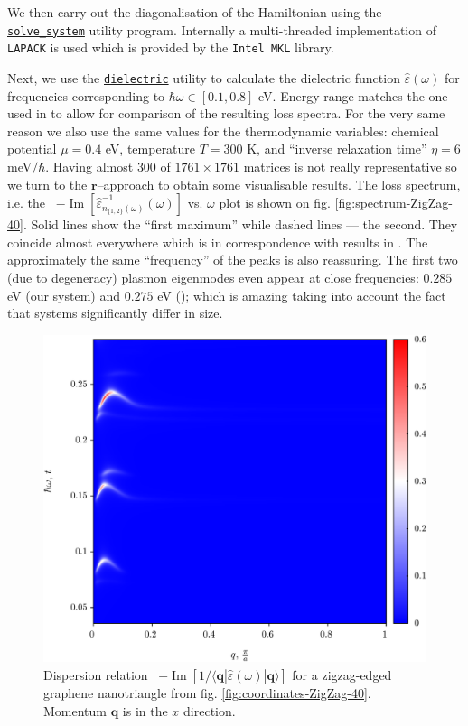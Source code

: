 \documentclass[a4paper,12pt]{article}
\begin{document}
    We then carry out the diagonalisation of the Hamiltonian using the \hyperref[code]{\texttt{solve\_system}} utility program. Internally a multi-threaded implementation of \texttt{LAPACK} is used which is provided by the \texttt{Intel MKL} \cite{intel-mkl} library.
    
    Next, we use the \hyperref[code]{\texttt{dielectric}} utility to calculate the dielectric function $\hat\varepsilon(\omega)$ for frequencies corresponding to $\hbar\omega \in [0.1,0.8]$ eV. Energy range matches the one used in \cite{plasmonic2015} to allow for comparison of the resulting loss spectra. For the very same reason we also use the same values for the thermodynamic variables: chemical potential $\mu = 0.4$ eV, temperature $T = 300$ K, and ``inverse relaxation time'' $\eta = 6$ meV$\!/\hbar$. Having almost $300$ of $1761\times1761$ matrices is not really representative so we turn to the $\mathbf{r}$--approach to obtain some visualisable results. The loss spectrum, i.e. the \ $-\operatorname{Im}[\hat\varepsilon^{-1}_{n_{\{1, 2\}}(\omega)}(\omega)]$ vs. $\omega$ plot is shown on fig. \ref{fig:spectrum-ZigZag-40}. Solid lines show the ``first maximum'' while dashed lines --- the second. They coincide almost everywhere which is in correspondence with results in \cite{plasmonic2015}. The approximately the same ``frequency'' of the peaks is also reassuring. The first two (due to degeneracy) plasmon eigenmodes even appear at close frequencies: $0.285$ eV (our system) and $0.275$ eV (\!\!\cite{plasmonic2015}); which is amazing taking into account the fact that systems significantly differ in size.

    \begin{figure}[h] 
    \center
    \includegraphics[width=\textwidth]{Spectrum-ZigZag-40-Q-Omega.png}
    \caption{Dispersion relation \ $-\operatorname{Im}[1 / \langle\mathbf{q}| \hat\varepsilon(\omega) |\mathbf{q}\rangle]$ for a zigzag-edged graphene nanotriangle from fig. \ref{fig:coordinates-ZigZag-40}. Momentum $\mathbf{q}$ is in the $x$ direction.}
    \label{fig:spectrum-ZigZag-40-Q-Omega}
    \end{figure}
\end{document}
